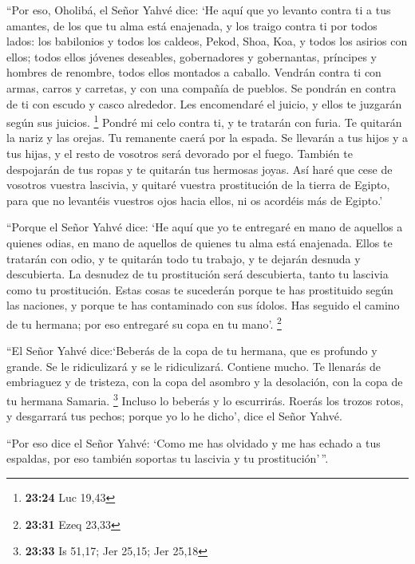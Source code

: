  ``Por eso, Oholibá, el Señor Yahvé dice: `He aquí que yo
levanto contra ti a tus amantes, de los que tu alma está enajenada, y
los traigo contra ti por todos lados:  los babilonios y
todos los caldeos, Pekod, Shoa, Koa, y todos los asirios con ellos;
todos ellos jóvenes deseables, gobernadores y gobernantas, príncipes y
hombres de renombre, todos ellos montados a caballo. 
Vendrán contra ti con armas, carros y carretas, y con una compañía de
pueblos. Se pondrán en contra de ti con escudo y casco alrededor. Les
encomendaré el juicio, y ellos te juzgarán según sus juicios.
\footnote{\textbf{23:24} Luc 19,43}  Pondré mi celo
contra ti, y te tratarán con furia. Te quitarán la nariz y las orejas.
Tu remanente caerá por la espada. Se llevarán a tus hijos y a tus hijas,
y el resto de vosotros será devorado por el fuego. 
También te despojarán de tus ropas y te quitarán tus hermosas joyas.
 Así haré que cese de vosotros vuestra lascivia, y
quitaré vuestra prostitución de la tierra de Egipto, para que no
levantéis vuestros ojos hacia ellos, ni os acordéis más de Egipto.'

 ``Porque el Señor Yahvé dice: `He aquí que yo te
entregaré en mano de aquellos a quienes odias, en mano de aquellos de
quienes tu alma está enajenada.  Ellos te tratarán con
odio, y te quitarán todo tu trabajo, y te dejarán desnuda y descubierta.
La desnudez de tu prostitución será descubierta, tanto tu lascivia como
tu prostitución.  Estas cosas te sucederán porque te has
prostituido según las naciones, y porque te has contaminado con sus
ídolos.  Has seguido el camino de tu hermana; por eso
entregaré su copa en tu mano'. \footnote{\textbf{23:31} Ezeq 23,33}

 ``El Señor Yahvé dice:`Beberás de la copa de tu hermana,
que es profundo y grande. Se le ridiculizará y se le ridiculizará.
Contiene mucho.  Te llenarás de embriaguez y de tristeza,
con la copa del asombro y la desolación, con la copa de tu hermana
Samaria. \footnote{\textbf{23:33} Is 51,17; Jer 25,15; Jer 25,18}
 Incluso lo beberás y lo escurrirás. Roerás los trozos
rotos, y desgarrará tus pechos; porque yo lo he dicho', dice el Señor
Yahvé.

 ``Por eso dice el Señor Yahvé: `Como me has olvidado y
me has echado a tus espaldas, por eso también soportas tu lascivia y tu
prostitución'\,''.

